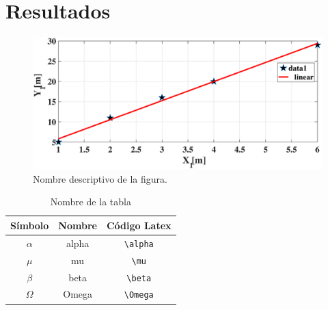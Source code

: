 \documentclass[journal]{IEEEtran}
\begin{document}
\section{Resultados}

\begin{figure}[H] %
  \centering  %
  \includegraphics[scale=0.23]{fig} %
  \caption{Nombre descriptivo de la figura.} %
  \label{lvdt4} %
  \end{figure}
  

\begin{table}[H]
\centering
\caption{Nombre de la tabla}
\label{table1}
\begin{tabular}{c c c}\hline\hline
\textbf{Símbolo} & \textbf{Nombre} & \textbf{Código Latex}\\ \hline
$\alpha$ & alpha & \verb|\alpha| \\
$\mu$ & mu & \verb|\mu|\\
$\beta$ & beta & \verb|\beta|\\
$\Omega$ & Omega & \verb|\Omega| \\\hline \hline
\end{tabular}
\end{table}

\end{document}
